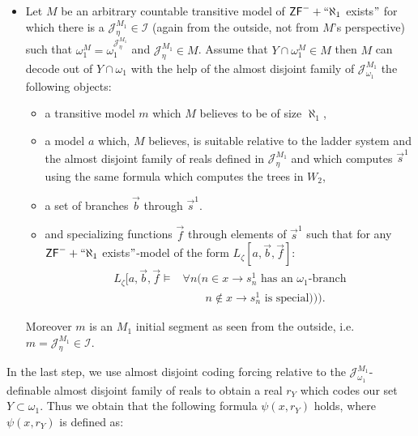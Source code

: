 \documentclass[a4paper,11pt]{article}
\newcommand{\ZFP}{\mathsf{ZF}^-}
\begin{document}
\begin{itemize}
\item[] Let $M$ be an arbitrary countable transitive model of $\ZFP + `` \aleph_1$ exists$"$ for which 
there is a $\mathcal{J}^{M_1}_{\eta} \in \mathcal{I}$ (again from the outside, not from $M$'s perspective) such that $\omega_1^M=\omega_1^{\mathcal{J}^{M_1}_{\eta}}$ and $\mathcal{J}^{M_1}_{\eta} \in M$. Assume that $Y \cap \omega_1^M \in M$ then $M$ can decode out of  $Y \cap \omega_1$ with the help of the almost disjoint family of $\mathcal{J}^{M_1}_{\omega_1}$ the following objects:
\begin{itemize}
\item a transitive model $m$ which $M$ believes to be of size $\aleph_1$,
\item a model $a$ which, $M$ believes, is suitable relative to the ladder system and the almost disjoint family of reals defined in $\mathcal{J}^{M_1}_{\eta}$ and which computes $\vec{s}^1$ using the same formula which computes the trees in $W_2$,
\item a set of branches $\vec{b}$ through $\vec{s}^1$.
\item and specializing functions $\vec{f}$ through elements of $\vec{s}^1$ such that for any $\ZFP+ ``\aleph_1$ exists$"$-model of the form $L_{\zeta} [a,\vec{b},\vec{f}]$:
\begin{align*}
L_{\zeta} [a,\vec{b},\vec{f} \models &\forall n ( n \in x \rightarrow s^1_{n}  \text{ has an $\omega_1$-branch}  \\&
		 \qquad   	n \notin x \rightarrow s^1_{n}  \text{ is special})) ).
\end{align*}



\end{itemize}
Moreover $m$ is an $M_1$ initial segment as seen from the outside, i.e. $m = \mathcal{J}^{M_1}_{\eta} \in \mathcal{I}$.
\end{itemize}
In the last step, we use almost disjoint coding forcing relative to the $\mathcal{J}^{M_1}_{\omega_1}$-definable almost disjoint family of reals to obtain a real $r_Y$ which codes our set $Y \subset \omega_1$. Thus we obtain that the following formula $\psi(x,r_Y)$ holds, where $\psi(x,r_Y)$ is defined as:
\end{document}
